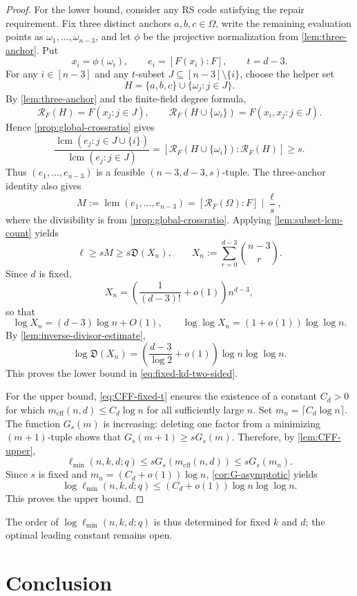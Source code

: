 \documentclass[11pt,onecolumn]{IEEEtran}
\newcommand{\lcmop}{\operatorname{lcm}}
\newcommand{\crf}{\mathscr R}
\newcommand{\mcff}{m_{\mathrm{cff}}}
\newcommand{\ellmin}{\ell_{\min}}
\begin{document}
\begin{proof}
For the lower bound, consider any RS code satisfying the
repair requirement.  Fix three distinct anchors $a,b,c\in\Omega$,
write the remaining evaluation points as
$\omega_1,\ldots,\omega_{n-3}$, and let $\phi$ be the
projective normalization from \cref{lem:three-anchor}.  Put
\[
x_i=\phi(\omega_i),\qquad e_i=[F(x_i):F],
\qquad t=d-3.
\]
For any $i\in[n-3]$ and any $t$-subset
$J\subseteq[n-3]\setminus\{i\}$, choose the helper set
\[
H=\{a,b,c\}\cup\{\omega_j:j\in J\}.
\]
By \cref{lem:three-anchor} and the finite-field degree formula,
\[
\crf_F(H)=F(x_j:j\in J),\qquad
\crf_F(H\cup\{\omega_i\})=F(x_i,x_j:j\in J).
\]
Hence \cref{prop:global-crossratio} gives
\[
\frac{\lcmop(e_j:j\in J\cup\{i\})}
     {\lcmop(e_j:j\in J)}
=[\crf_F(H\cup\{\omega_i\}):\crf_F(H)]\ge s.
\]
Thus $(e_1,\ldots,e_{n-3})$ is a feasible
$(n-3,d-3,s)$-tuple.  The three-anchor identity also gives
\[
M:=\lcmop(e_1,\ldots,e_{n-3})
=[\crf_F(\Omega):F]\mid\frac{\ell}{s},
\]
where the divisibility is from \cref{prop:global-crossratio}.
Applying \cref{lem:subset-lcm-count} yields
\[
\ell\ge sM\ge s\mathfrak D(X_n),
\qquad
X_n:=\sum_{r=0}^{d-3}\binom{n-3}{r}.
\]
Since $d$ is fixed,
\[
X_n=\left(\frac{1}{(d-3)!}+o(1)\right)n^{d-3},
\]
so that
\[
\log X_n=(d-3)\log n+O(1),\qquad
\log\log X_n=(1+o(1))\log\log n.
\]
By \cref{lem:inverse-divisor-estimate},
\[
\log\mathfrak D(X_n)
=\left(\frac{d-3}{\log2}+o(1)\right)
\log n\log\log n.
\]
This proves the lower bound in \eqref{eq:fixed-kd-two-sided}.

For the upper bound, \eqref{eq:CFF-fixed-t} ensures the existence of a constant
$C_d>0$ for which $\mcff(n,d)\le C_d\log n$ for all
sufficiently large $n$.  Set $m_n=\lceil C_d\log n\rceil$.
The function $G_s(m)$ is increasing: deleting one factor from
a minimizing $(m+1)$-tuple shows that
$G_s(m+1)\ge sG_s(m)$.  Therefore, by
\cref{lem:CFF-upper},
\[
\ellmin(n,k,d;q)
\le sG_s(\mcff(n,d))\le sG_s(m_n).
\]
Since $s$ is fixed and $m_n=(C_d+o(1))\log n$,
\cref{cor:G-asymptotic} yields
\[
\log\ellmin(n,k,d;q)
\le(C_d+o(1))\log n\log\log n.
\]
This proves the upper bound.
\end{proof}

The order of $\log\ellmin(n,k,d;q)$ is thus determined for
fixed $k$ and $d$; the optimal leading constant remains open.


\section{Conclusion}
\label{sec:conclusion}
\end{document}
